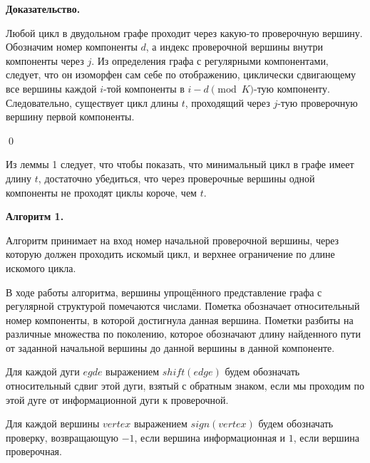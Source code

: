 \documentclass[14pt]{mmcs-article}
\begin{document}
\textbf{Доказательство.}

Любой цикл в двудольном графе проходит через какую-то проверочную вершину. Обозначим номер компоненты $d$, а индекс проверочной вершины внутри компоненты через $j$. Из определения графа с регулярными компонентами, следует, что он изоморфен сам себе по отображению, циклически сдвигающему все вершины каждой $i$-той компоненты в $i - d \pmod K$-тую компоненту. Следовательно, существует цикл длины $t$, проходящий через $j$-тую проверочную вершину первой компоненты.

\qed

Из леммы 1 следует, что чтобы показать, что минимальный цикл в графе имеет длину $t$, достаточно убедиться, что через проверочные вершины одной компоненты не проходят циклы короче, чем $t$.

\textbf{Алгоритм 1.} 

Алгоритм принимает на вход номер начальной проверочной вершины, через которую должен проходить искомый цикл, и верхнее ограничение по длине искомого цикла.

В ходе работы алгоритма, вершины упрощённого представление графа с регулярной структурой помечаются числами. Пометка обозначает относительный номер компоненты, в которой достигнула данная вершина. Пометки разбиты на различные множества по поколению, которое обозначают длину найденного пути от заданной начальной вершины до данной вершины в данной компоненте.

Для каждой дуги $egde$ выражением $shift(edge)$ будем обозначать относительный сдвиг этой дуги, взятый с обратным знаком, если мы проходим по этой дуге от информационной дуги к проверочной.

Для каждой вершины $vertex$ выражением $sign(vertex)$ будем обозначать проверку, возвращающую $-1$, если вершина информационная и $1$, если вершина проверочная.
\end{document}
